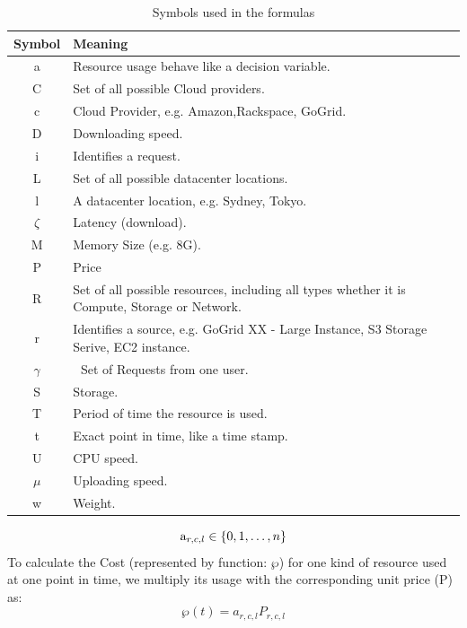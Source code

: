 \begin{table}[!ht]
\begin{center}\caption{Symbols used in the formulas} \label{table:formula_symbols}
\begin{tabular}{|c|p{10cm}|}
\hline
\textbf{Symbol }&  \textbf{Meaning  }  \\
\hline a & Resource usage behave like a decision variable. \\
\hline C & Set of all possible Cloud providers. \\
\hline c & Cloud Provider, e.g. Amazon,Rackspace, GoGrid. \\
\hline D & Downloading speed. \\
\hline i & Identifies a request. \\
\hline L & Set of all possible datacenter locations. \\
\hline l & A datacenter location, e.g. Sydney, Tokyo. \\
\hline $\zeta$ & Latency (download). \\
\hline  M & Memory Size (e.g. 8G). \\
\hline  P & Price \\
\hline  R & Set of all possible resources, including all types whether it is Compute, Storage or Network.\\
\hline  r & Identifies a source, e.g. GoGrid XX - Large Instance, S3 Storage Serive, EC2 instance.\\
\hline $\gamma $ & $\;$ Set of Requests from one user. \\
\hline  S & Storage. \\
\hline  T & Period of time the resource is used. \\
\hline  t & Exact point in time, like a time stamp. \\
\hline  U & CPU speed. \\
\hline $\mu$ & Uploading speed. \\
\hline w & Weight. \\
\hline
\end{tabular}
\end{center}
\end{table}

\begin{equation}\label{eq:a}
{{\rm{a}}_{r,c,l}} \in \{ 0,1, \ldots ,n\}
\end{equation}
To calculate the Cost (represented by function: $\wp $) for one kind of resource used at one point in time, we multiply its usage with the corresponding unit price (P) as:
\begin{equation}\label{eq:p}
\wp (t) = {a_{r,c,l}}{P_{r,c,l}}
\end{equation}

